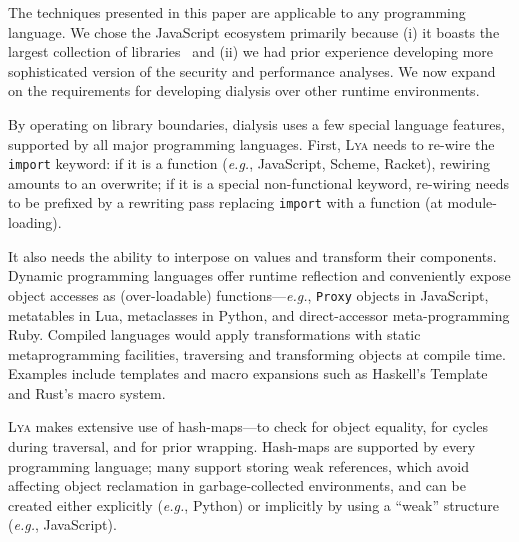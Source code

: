 \documentclass[letterpaper,twocolumn,10pt]{article}
\def\eg{{\em e.g.}, }
\newcommand{\ttt}[1]{\texttt{#1}}
\newcommand{\sys}{{\scshape Lya}\xspace}
\begin{document}
The techniques presented in this paper are applicable to any programming language.
We chose the JavaScript ecosystem %
primarily because
  (i) it boasts the largest collection of libraries~\cite{modulecounts} and
	(ii) we had prior experience developing more sophisticated version of the security and performance analyses.
We now expand on the requirements for developing dialysis over other runtime environments.

By operating on library boundaries, dialysis uses a few special language features, supported by all major programming languages.
First, \sys needs to re-wire the \ttt{import} keyword:
  if it is a function (\eg JavaScript, Scheme, Racket), rewiring amounts to an overwrite;
  if it is a special non-functional keyword, re-wiring needs to be prefixed by a rewriting pass replacing \ttt{import} with a function (at module-loading).

It also needs the ability to interpose on values and transform their components.
Dynamic programming languages offer runtime reflection and conveniently expose object accesses as (over-loadable) functions---\eg \ttt{Proxy} objects in JavaScript, metatables in Lua, metaclasses in Python, and direct-accessor meta-programming Ruby.
Compiled languages would apply transformations with static metaprogramming facilities, traversing and transforming objects at compile time.
Examples include templates and macro expansions such as Haskell's Template and Rust's macro system.

\sys makes extensive use of hash-maps---to check for object equality, for cycles during traversal, and for prior wrapping.
Hash-maps are supported by every programming language; many support storing weak references, which avoid affecting object reclamation in garbage-collected environments, and can be created either explicitly (\eg Python) or implicitly by using a ``weak'' structure (\eg JavaScript).
\end{document}

